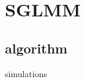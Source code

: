 \documentclass[12pt,compress,xcolor=x11names,UTF8]{beamer}
\begin{document}
\section{SGLMM}
\subsection{algorithm}

\begin{frame}{simulations }
\end{frame}
\end{document}
